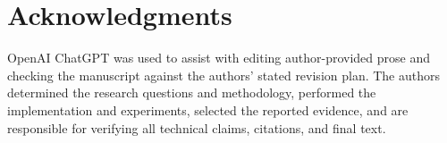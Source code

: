 \documentclass[sigplan,anonymous,review,nonacm]{acmart}
\begin{document}

\maketitle










\section*{Acknowledgments}
OpenAI ChatGPT was used to assist with editing author-provided prose and checking the manuscript against the authors' stated revision plan. The authors determined the research questions and methodology, performed the implementation and experiments, selected the reported evidence, and are responsible for verifying all technical claims, citations, and final text.



\end{document}
